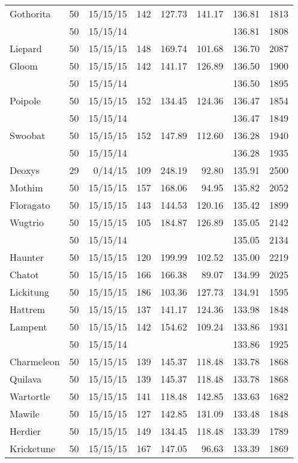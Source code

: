 \begin{longtable}{lrrrrrrr}
Gothorita & 50 & 15/15/15 & 142 & 127.73 & 141.17 & 136.81 & 1813\\
 & 50 & 15/15/14 & & & & 136.81 & 1808\\
Liepard & 50 & 15/15/15 & 148 & 169.74 & 101.68 & 136.70 & 2087\\
Gloom & 50 & 15/15/15 & 142 & 141.17 & 126.89 & 136.50 & 1900\\
 & 50 & 15/15/14 & & & & 136.50 & 1895\\
Poipole & 50 & 15/15/15 & 152 & 134.45 & 124.36 & 136.47 & 1854\\
 & 50 & 15/15/14 & & & & 136.47 & 1849\\
Swoobat & 50 & 15/15/15 & 152 & 147.89 & 112.60 & 136.28 & 1940\\
 & 50 & 15/15/14 & & & & 136.28 & 1935\\
Deoxys & 29 & 0/14/15 & 109 & 248.19 & 92.80 & 135.91 & 2500\\
Mothim & 50 & 15/15/15 & 157 & 168.06 & 94.95 & 135.82 & 2052\\
Floragato & 50 & 15/15/15 & 143 & 144.53 & 120.16 & 135.42 & 1899\\
Wugtrio & 50 & 15/15/15 & 105 & 184.87 & 126.89 & 135.05 & 2142\\
 & 50 & 15/15/14 & & & & 135.05 & 2134\\
Haunter & 50 & 15/15/15 & 120 & 199.99 & 102.52 & 135.00 & 2219\\
Chatot & 50 & 15/15/15 & 166 & 166.38 & 89.07 & 134.99 & 2025\\
Lickitung & 50 & 15/15/15 & 186 & 103.36 & 127.73 & 134.91 & 1595\\
Hattrem & 50 & 15/15/15 & 137 & 141.17 & 124.36 & 133.98 & 1848\\
Lampent & 50 & 15/15/15 & 142 & 154.62 & 109.24 & 133.86 & 1931\\
 & 50 & 15/15/14 & & & & 133.86 & 1925\\
Charmeleon & 50 & 15/15/15 & 139 & 145.37 & 118.48 & 133.78 & 1868\\
Quilava & 50 & 15/15/15 & 139 & 145.37 & 118.48 & 133.78 & 1868\\
Wartortle & 50 & 15/15/15 & 141 & 118.48 & 142.85 & 133.63 & 1682\\
Mawile & 50 & 15/15/15 & 127 & 142.85 & 131.09 & 133.48 & 1848\\
Herdier & 50 & 15/15/15 & 149 & 134.45 & 118.48 & 133.39 & 1789\\
Kricketune & 50 & 15/15/15 & 167 & 147.05 & 96.63 & 133.39 & 1869\\

\end{longtable}
